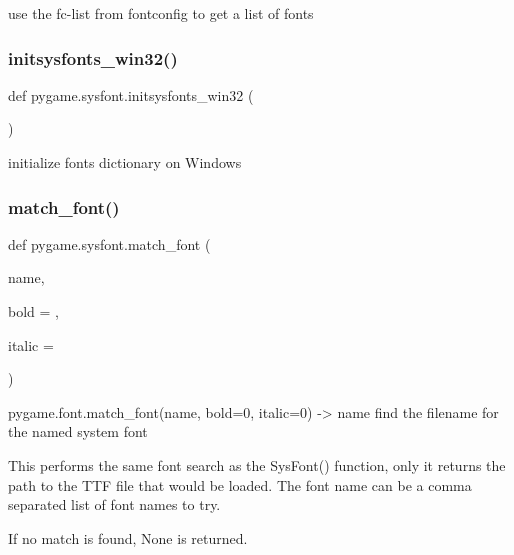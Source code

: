 \begin{DoxyVerb}use the fc-list from fontconfig to get a list of fonts\end{DoxyVerb}
 \mbox{\label{namespacepygame_1_1sysfont_a4c6fd06092a769ddea25f6d6689123c1}} 
\subsubsection{\texorpdfstring{initsysfonts\+\_\+win32()}{initsysfonts\_win32()}}
{\footnotesize\ttfamily def pygame.\+sysfont.\+initsysfonts\+\_\+win32 (\begin{DoxyParamCaption}{ }\end{DoxyParamCaption})}

\begin{DoxyVerb}initialize fonts dictionary on Windows\end{DoxyVerb}
 \mbox{\label{namespacepygame_1_1sysfont_ac3b76edd6da1240d04a304494b146533}} 
\subsubsection{\texorpdfstring{match\+\_\+font()}{match\_font()}}
{\footnotesize\ttfamily def pygame.\+sysfont.\+match\+\_\+font (\begin{DoxyParamCaption}\item[{}]{name,  }\item[{}]{bold = {},  }\item[{}]{italic = {} }\end{DoxyParamCaption})}

\begin{DoxyVerb}pygame.font.match_font(name, bold=0, italic=0) -> name
   find the filename for the named system font

   This performs the same font search as the SysFont()
   function, only it returns the path to the TTF file
   that would be loaded. The font name can be a comma
   separated list of font names to try.

   If no match is found, None is returned.
\end{DoxyVerb}
 \mbox{\label{namespacepygame_1_1sysfont_aabc5b6a67cce402313f524fcc4736f88}} 
